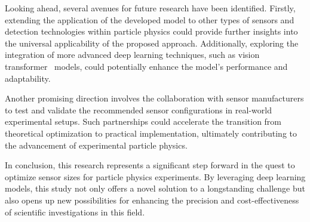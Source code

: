 \documentclass[conference]{IEEEtran}
\begin{document}
Looking ahead, several avenues for future research have been identified. Firstly, extending the application of the developed model to other types of sensors and detection technologies within particle physics could provide further insights into the universal applicability of the proposed approach. Additionally, exploring the integration of more advanced deep learning techniques, such as vision transformer~\cite{dosovitskiy2021image} models, could potentially enhance the model's performance and adaptability.

Another promising direction involves the collaboration with sensor manufacturers to test and validate the recommended sensor configurations in real-world experimental setups. Such partnerships could accelerate the transition from theoretical optimization to practical implementation, ultimately contributing to the advancement of experimental particle physics.

In conclusion, this research represents a significant step forward in the quest to optimize sensor sizes for particle physics experiments. By leveraging deep learning models, this study not only offers a novel solution to a longstanding challenge but also opens up new possibilities for enhancing the precision and cost-effectiveness of scientific investigations in this field.

\vspace{12pt}





\end{document}
